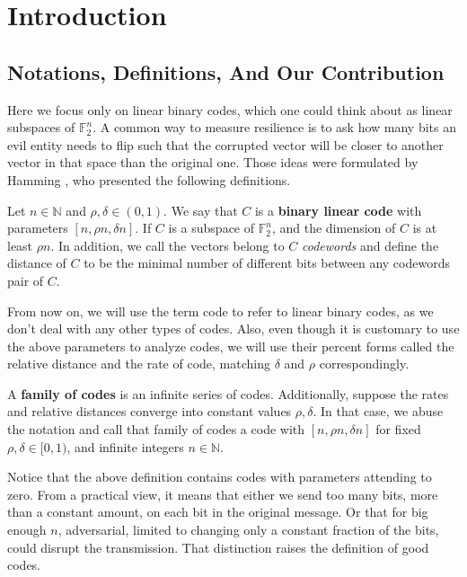   \section{Introduction}
  
  \subsection{Notations, Definitions, And Our Contribution}
  Here we focus only on linear binary codes, which one could think about as linear subspaces of $\mathbb{F}_{2}^{n}$. A common way to measure resilience is to ask how many bits an evil entity needs to flip such that the corrupted vector will be closer to another vector in that space than the original one. Those ideas were formulated by Hamming \cite{Hamming}, who presented the following definitions. 
  \begin{definition} \label{bi-code} Let $n \in \mathbb{N}$ and $\rho, \delta\in \left( 0,1 \right)$. We say that $C$ is a \textbf{binary linear code} with parameters $[n, \rho n, \delta n]$. If $C$ is a subspace of $\mathbb{F}_{2}^{n}$, and the dimension of $C$ is at least $\rho n$. In addition, we call the vectors belong to $C$ \textit{codewords} and define the distance of $C$ to be the minimal number of different bits between any codewords pair of $C$.   
  \end{definition}
  From now on, we will use the term code to refer to linear binary codes, as we don't deal with any other types of codes. Also, even though it is customary to use the above parameters to analyze codes, we will use their percent forms called the relative distance and the rate of code, matching $\delta$ and $\rho$ correspondingly.     
  \begin{definition} \label{family} A \textbf{family of codes} is an infinite series of codes. Additionally, suppose the rates and relative distances converge into constant values $\rho,\delta$. In that case, we abuse the notation and call that family of codes a code with $[n, \rho n, \delta n]$ for fixed $\rho, \delta\in [ 0,1 )$, and infinite integers $n \in \mathbb{N}$.     
  \end{definition}
  Notice that the above definition contains codes with parameters attending to zero. From a practical view, it means that either we send too many bits, more than a constant amount, on each bit in the original message. Or that for big enough $n$, adversarial, limited to changing only a constant fraction of the bits, could disrupt the transmission. That distinction raises the definition of good codes.

